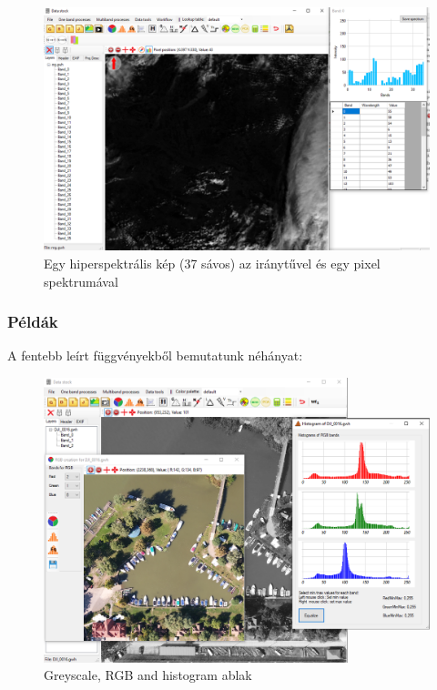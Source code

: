 \documentclass[a4paper,12pt]{article}
\begin{document}
	\begin{figure}
	\centering
	\includegraphics[width=13cm]{spect_compass}
	\caption{Egy hiperspektrális kép (37 sávos) az iránytűvel és egy pixel spektrumával}
	\label{fig:spektrum_compass}
	\end{figure}


\subsubsection{Példák}

A fentebb leírt függvényekből bemutatunk néhányat:

	\begin{figure}
	\centering
	\includegraphics[width=12cm]{gw1.png}
	\caption{Greyscale, RGB and histogram ablak}
	\label{fig:gw1}
\end{figure}
\end{document}
